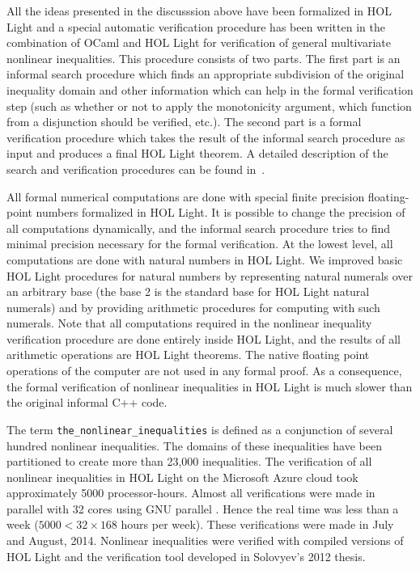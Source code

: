 All the ideas presented in the discusssion above have been
formalized in HOL Light and a special automatic verification procedure
has been written in the combination of OCaml and HOL Light for
verification of general multivariate nonlinear inequalities. This
procedure consists of two parts. The first part is an informal search
procedure which finds an appropriate subdivision of the original
inequality domain and other information which can help in the formal
verification step (such as whether or not to apply the monotonicity
argument, which function from a disjunction should be verified,
etc.). The second part is a formal verification procedure which takes
the result of the informal search procedure as input and produces a
final HOL Light theorem. A detailed description of the search and
verification procedures can be found
in~\cite{Solovyev-thesis,Solovyev:NFM2013}.

All formal numerical computations are done with special finite
precision floating-point numbers formalized in HOL Light. It is
possible to change the precision of all computations dynamically, and
the informal search procedure tries to find minimal precision
necessary for the formal verification. At the lowest level, all
computations are done with natural numbers in HOL Light. We improved
basic HOL Light procedures for natural numbers by representing natural
numerals over an arbitrary base (the base 2 is the standard base for
HOL Light natural numerals) and by providing arithmetic procedures for
computing with such numerals. Note that all computations required in
the nonlinear inequality verification procedure are done entirely
inside HOL Light, and the results of all arithmetic operations are HOL
Light theorems.  The native floating point operations of the computer
are not used in any formal proof.  As a consequence, the formal
verification of nonlinear inequalities in HOL Light is much slower
than the original informal C++ code.

The term \verb!the_nonlinear_inequalities! is defined as a conjunction
of several hundred nonlinear inequalities. The domains of these
inequalities have been partitioned to create more than 23,000
inequalities. The verification of all nonlinear inequalities in HOL
Light on the Microsoft Azure cloud took approximately 5000
processor-hours. Almost all verifications were made in parallel with
32 cores using GNU parallel \cite{Tange2011a}.  Hence the real time
was less than a week ($5000 < 32\times 168$ hours per week). These
verifications were made in July and August, 2014.  Nonlinear
inequalities were verified with compiled versions of HOL Light and the
verification tool developed in Solovyev's 2012 thesis.


